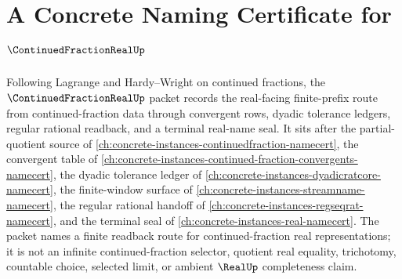 \chapter{A Concrete Naming Certificate for $\ContinuedFractionRealUp$}
\label{ch:concrete-instances-continued-fraction-real-namecert}

Following Lagrange and Hardy--Wright on continued fractions, the $\ContinuedFractionRealUp$ packet records the real-facing finite-prefix route from continued-fraction data through convergent rows, dyadic tolerance ledgers, regular rational readback, and a terminal real-name seal. It sits after the partial-quotient source of \autoref{ch:concrete-instances-continuedfraction-namecert}, the convergent table of \autoref{ch:concrete-instances-continued-fraction-convergents-namecert}, the dyadic tolerance ledger of \autoref{ch:concrete-instances-dyadicratcore-namecert}, the finite-window surface of \autoref{ch:concrete-instances-streamname-namecert}, the regular rational handoff of \autoref{ch:concrete-instances-regseqrat-namecert}, and the terminal seal of \autoref{ch:concrete-instances-real-namecert}. The packet names a finite readback route for continued-fraction real representations; it is not an infinite continued-fraction selector, quotient real equality, trichotomy, countable choice, selected limit, or ambient $\RealUp$ completeness claim.


